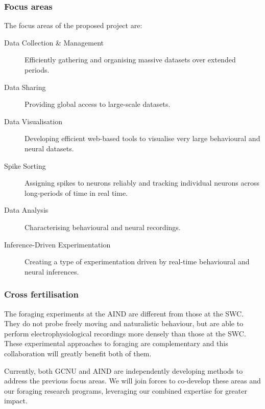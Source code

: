 \subsubsection{Focus areas}

The focus areas of the proposed project are:

\begin{description}

    \item[Data Collection \& Management] Efficiently gathering and organising
        massive datasets over extended periods.

    \item[Data Sharing] Providing global access to large-scale datasets.

    \item[Data Visualisation] Developing efficient web-based tools to visualise
        very large behavioural and neural datasets.

    \item[Spike Sorting] Assigning spikes to neurons reliably and tracking
        individual neurons across long-periods of time in real time.

    \item[Data Analysis] Characterising behavioural and neural recordings.

    \item[Inference-Driven Experimentation] Creating a type of experimentation
        driven by real-time behavioural and neural inferences.

\end{description}

\subsubsection{Cross fertilisation}

The foraging experiments at the AIND are different from those at the SWC. They
do not probe freely moving and naturalistic behaviour, but are able to perform
electrophysiological recordings more densely than those at the SWC.
%
These experimental approaches to foraging are complementary and this
collaboration will greatly benefit both of them.

Currently, both GCNU and AIND are independently developing methods to address
the previous focus areas. We will join forces to co-develop these areas and
our foraging research programs, leveraging our combined expertise for greater
impact.
